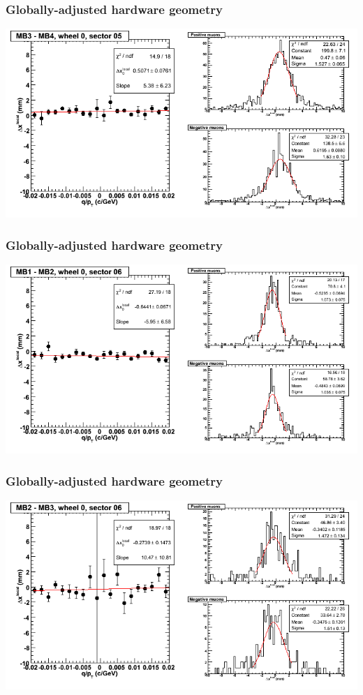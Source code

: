 \documentclass[compress]{beamer}
\begin{document}
\begin{frame}
\frametitle{Globally-adjusted hardware geometry}
\includegraphics[width=\linewidth]{NOV4_segdiffs_HW/dt13_resid_C_05_34.png}
\end{frame}

\begin{frame}
\frametitle{Globally-adjusted hardware geometry}
\includegraphics[width=\linewidth]{NOV4_segdiffs_HW/dt13_resid_C_06_12.png}
\end{frame}

\begin{frame}
\frametitle{Globally-adjusted hardware geometry}
\includegraphics[width=\linewidth]{NOV4_segdiffs_HW/dt13_resid_C_06_23.png}
\end{frame}
\end{document}
